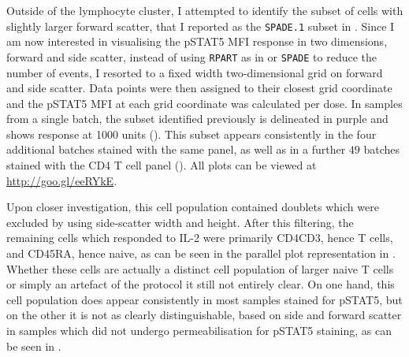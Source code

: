 Outside of the lymphocyte cluster, I attempted to identify the subset of cells with slightly larger forward scatter, that I reported as the \texttt{SPADE.1} subset in .
Since I am now interested in visualising the pSTAT5 MFI response in two dimensions, forward and side scatter, instead of using \texttt{RPART} as in  or \texttt{SPADE} to reduce the number of events, I resorted to a fixed width two-dimensional grid on forward and side scatter.
Data points were then assigned to their closest grid coordinate and the pSTAT5 MFI at each grid coordinate was calculated per dose.
In samples from a single batch, the subset identified previously is delineated in purple and shows response at 1000 units ().
This subset appears consistently in the four additional batches stained with the same panel,
as well as in a further $49$ batches stained with the CD4 T cell panel ().
All plots can be viewed at \url{http://goo.gl/eeRYkE}.

Upon closer investigation, this cell population contained doublets which were excluded by using side-scatter width and height.
After this filtering, the remaining cells which responded to IL-2 were primarily CD4\positive CD3\positive, hence T cells, and CD45RA\positive, hence naive, as can be seen in the parallel plot representation in .
Whether these cells are actually a distinct cell population of larger naive T cells or simply an artefact of the protocol it still not entirely clear.
On one hand, this cell population does appear consistently in most samples stained for pSTAT5, but on the other it is not as clearly distinguishable, based on side and forward scatter in samples which did not undergo permeabilisation for pSTAT5 staining, as can be seen in .


